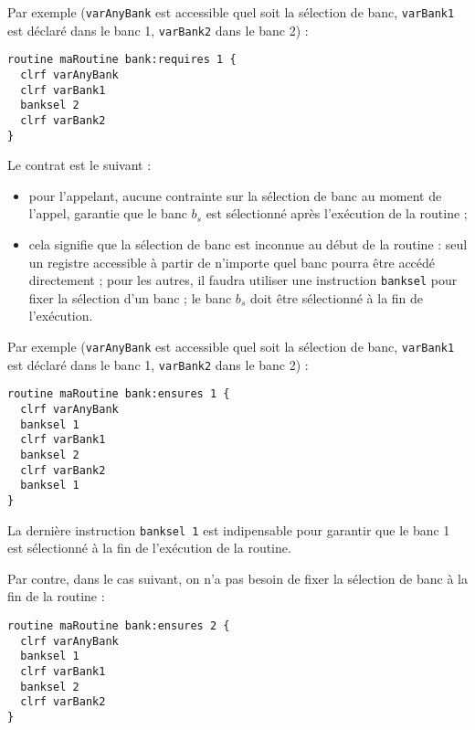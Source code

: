Par exemple (\texttt{varAnyBank} est accessible quel soit la sélection de banc, \texttt{varBank1} est déclaré dans le banc 1, \texttt{varBank2} dans le banc 2) :
\begin{lstlisting}[language=piccolo]
routine maRoutine bank:requires 1 {
  clrf varAnyBank
  clrf varBank1
  banksel 2
  clrf varBank2
}
\end{lstlisting}








Le contrat est le suivant :
\begin{itemize}
  \item pour l'appelant, aucune contrainte sur la sélection de banc au moment de l'appel, garantie que le banc $b_s$ est sélectionné après l'exécution de la routine ; 
  \item cela signifie que la sélection de banc est inconnue au début de la routine : seul un registre accessible à partir de n'importe quel banc pourra être accédé directement ; pour les autres, il faudra utiliser une instruction \texttt{banksel} pour fixer la sélection d'un banc ; le banc $b_s$ doit être sélectionné à la fin de l'exécution.
\end{itemize}

Par exemple (\texttt{varAnyBank} est accessible quel soit la sélection de banc, \texttt{varBank1} est déclaré dans le banc 1, \texttt{varBank2} dans le banc 2) :
\begin{lstlisting}[language=piccolo]
routine maRoutine bank:ensures 1 {
  clrf varAnyBank
  banksel 1
  clrf varBank1
  banksel 2
  clrf varBank2
  banksel 1
}
\end{lstlisting}

La dernière instruction \texttt{banksel 1} est indipensable pour garantir que le banc 1 est sélectionné à la fin de l'exécution de la routine.


Par contre, dans le cas suivant, on n'a pas besoin de fixer la sélection de banc à la fin de la routine :
\begin{lstlisting}[language=piccolo]
routine maRoutine bank:ensures 2 {
  clrf varAnyBank
  banksel 1
  clrf varBank1
  banksel 2
  clrf varBank2
}
\end{lstlisting}












